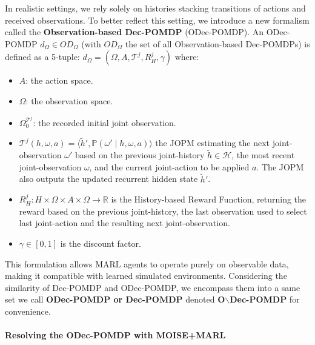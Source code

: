 \noindent In realistic settings, we rely solely on histories stacking transitions of actions and received observations. To better reflect this setting, we introduce a new formalism called the \textbf{Observation-based Dec-POMDP} (ODec-POMDP).
%
An ODec-POMDP $d_\Omega \in OD_\Omega$ (with $OD_\Omega$ the set of all Observation-based Dec-POMDPs) is defined as a 5-tuple:
%
$d_\Omega = \left(\Omega, A, \mathcal{T}^j, R^j_H, \gamma \right)$
%
where:
\begin{itemize}
    \item $A$: the action space.
    \item $\Omega$: the observation space.
    \item $\Omega^{\mathcal{T}^j}_0$: the recorded initial joint observation.
    \item $\mathcal{T}^j(h, \omega, a) = \langle {\tilde{h}}', \mathbb{P}(\omega' \mid h, \omega, a) \rangle$ the JOPM estimating the next joint-observation $\omega'$ based on the previous joint-history $\tilde{h} \in \mathcal{H}$, the most recent joint-observation $\omega$, and the current joint-action to be applied $a$. The JOPM also outputs the updated recurrent hidden state $\tilde{h}'$.
    \item $R^j_H: H \times \Omega \times A \times \Omega \rightarrow \mathbb{R}$ is the History-based Reward Function, returning the reward based on the previous joint-history, the last observation used to select last joint-action and the resulting next joint-observation.
    \item $\gamma \in [0, 1]$ is the discount factor.
\end{itemize}

\noindent This formulation allows MARL agents to operate purely on observable data, making it compatible with learned simulated environments. Considering the similarity of Dec-POMDP and ODec-POMDP, we encompass them into a same set we call \textbf{ODec-POMDP or Dec-POMDP} denoted \textbf{O$\backslash$Dec-POMDP} for convenience.

\paragraph{\textbf{Resolving the ODec-POMDP with MOISE+MARL}}

